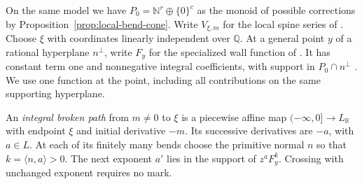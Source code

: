 \documentclass[11pt,reqno]{amsart}
\numberwithin{equation}{section}
\theoremstyle{definition}
\theoremstyle{remark}
\begin{document}
On the same model we have \(P_0=\mathbb N^r\oplus\{0\}^c\) as the
monoid of possible corrections by Proposition~\ref{prop:local-bend-cone}. Write \(V_{\xi,m}\) for the
local spine series of \cite[Definition~20.20]{KY}. Choose \(\xi\) with
coordinates linearly independent over \(\mathbb Q\). At a general
point \(y\) of a rational hyperplane \(n^\perp\), write \(F_y\) for
the specialized wall function of \cite[Definition~20.32]{KY}.
It has constant term one and nonnegative integral coefficients, with
support in \(P_0\cap n^\perp\)
\cite[Lemma~20.3 and Propositions~20.13, 20.33]{KY}.
We use one function at the point, including all contributions on the
same supporting hyperplane.

An \emph{integral broken path} from \(m\ne0\) to \(\xi\) is a piecewise affine
map \((-\infty,0]\to L_{\mathbb R}\) with endpoint \(\xi\) and initial
derivative \(-m\). Its successive derivatives are \(-a\), with
\(a\in L\). At each of its finitely many bends choose the primitive
normal \(n\) so that \(k=\langle n,a\rangle>0\). The next exponent
\(a'\) lies in the support of \(z^aF_y^k\). Crossing with unchanged exponent
requires no mark.
\end{document}
